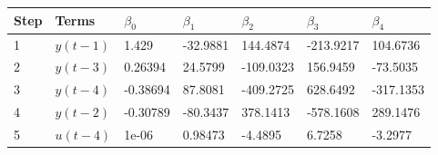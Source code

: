\begin{tabular}{lllllll}
Step & Terms & $\beta_{0}$ & $\beta_{1}$ & $\beta_{2}$ & $\beta_{3}$ & $\beta_{4}$ \\ 
\hline 
1 & $y(t-1)$ & 1.429 & -32.9881 & 144.4874 & -213.9217 & 104.6736 \\ 
2 & $y(t-3)$ & 0.26394 & 24.5799 & -109.0323 & 156.9459 & -73.5035 \\ 
3 & $y(t-4)$ & -0.38694 & 87.8081 & -409.2725 & 628.6492 & -317.1353 \\ 
4 & $y(t-2)$ & -0.30789 & -80.3437 & 378.1413 & -578.1608 & 289.1476 \\ 
5 & $u(t-4)$ & 1e-06 & 0.98473 & -4.4895 & 6.7258 & -3.2977 \\ 
\hline 
\end{tabular}